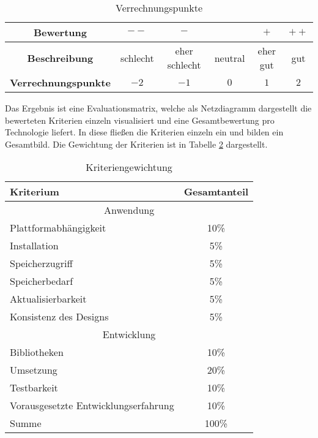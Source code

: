\begin{table}[h!]
	\centering
	\begin{tabular}{|c|c|c|c|c|c|}
		\hline 	
			\textbf{Bewertung} & $--$ & $-$ & \Circle & $+$ & $++$ \\ 
		\hline 
			\textbf{Beschreibung} & schlecht & eher schlecht & neutral & eher gut & gut \\ 
		\hline 
			\textbf{Verrechnungspunkte} & $-2$ & $-1$ & $0$ & $1$ & $2$ \\ 
		\hline 		
	\end{tabular} 
	\caption{Verrechnungspunkte} \label{tab:verrechnungspunkte}
\end{table}

Das Ergebnis ist eine Evaluationsmatrix, welche als Netzdiagramm dargestellt die bewerteten Kriterien einzeln visualisiert und eine Gesamtbewertung pro Technologie liefert. In diese fließen die Kriterien einzeln ein und bilden ein Gesamtbild. Die Gewichtung der Kriterien ist in Tabelle \ref{tab:punktekatalog} dargestellt.

\begin{table}[h!]
	\centering
	\begin{tabular}{|l|c|}
		\hline
		Kriterium              & Gesamtanteil \\
		\hline
		\multicolumn{2}{c}{Anwendung}     \\
		\hline
		Plattformabhängigkeit   & 10\%         \\
		Installation           & 5\%          \\
		Speicherzugriff        & 5\%          \\
		Speicherbedarf         & 5\%          \\
		Aktualisierbarkeit     & 5\%          \\
		Konsistenz des Designs & 5\%         \\
		
		\hline
		\multicolumn{2}{c}{Entwicklung}     \\
		\hline
		Bibliotheken           & 10\%         \\
		Umsetzung              & 20\%         \\
		Testbarkeit            & 10\%         \\
		Vorausgesetzte Entwicklungserfahrung    & 10\%         \\
		\hline
		\hline
		Summe                  & 100\%        \\
		\hline
	\end{tabular}
	\caption{Kriteriengewichtung} \label{tab:punktekatalog}
\end{table}
\newpage
